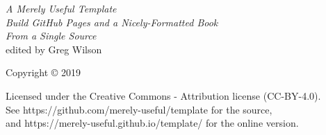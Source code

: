 {\Huge\itshape A Merely Useful Template}\\[\baselineskip]

{\large\itshape
  Build GitHub Pages and a Nicely-Formatted Book\\
  From a Single Source
}\\[0.2\textheight]

{\large edited by Greg Wilson}\par

\vfill

{\large Copyright {\copyright} 2019}

\vspace*{\baselineskip}


\vspace*{\baselineskip}

{\small
  Licensed under the Creative Commons - Attribution license (CC-BY-4.0).
  \\
  See https://github.com/merely-useful/template for the source,\\
  and https://merely-useful.github.io/template/ for the online version.
}
